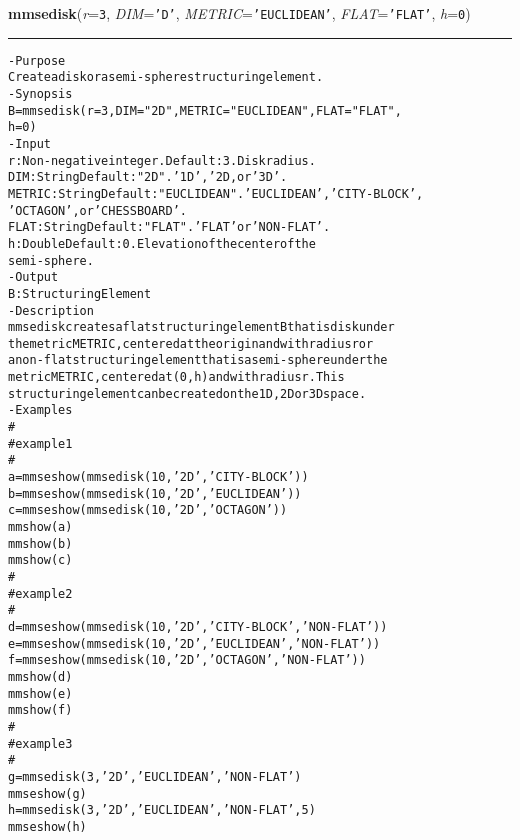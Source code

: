     \begin{boxedminipage}{\textwidth}

    \raggedright \textbf{mmsedisk}(\textit{r}=\texttt{3\-}, \textit{DIM}=\texttt{'\-D\-'\-}, \textit{METRIC}=\texttt{'\-E\-U\-C\-L\-I\-D\-E\-A\-N\-'\-}, \textit{FLAT}=\texttt{'\-F\-L\-A\-T\-'\-}, \textit{h}=\texttt{0\-})

    \vspace{-1.5ex}

    \rule{\textwidth}{0.5\fboxrule}
\begin{alltt}
- Purpose
    Create a disk or a semi-sphere structuring element.
- Synopsis
    B = mmsedisk(r=3, DIM="2D", METRIC="EUCLIDEAN", FLAT="FLAT",
    h=0)
- Input
    r:      Non-negative integer. Default: 3. Disk radius.
    DIM:    String Default: "2D". '1D', '2D, or '3D'.
    METRIC: String Default: "EUCLIDEAN". 'EUCLIDEAN', ' CITY-BLOCK',
            'OCTAGON', or ' CHESSBOARD'.
    FLAT:   String Default: "FLAT". 'FLAT' or 'NON-FLAT'.
    h:      Double Default: 0. Elevation of the center of the
            semi-sphere.
- Output
    B: Structuring Element
- Description
    mmsedisk creates a flat structuring element B that is disk under
    the metric METRIC , centered at the origin and with radius r or
    a non-flat structuring element that is a semi-sphere under the
    metric METRIC, centered at (0, h) and with radius r . This
    structuring element can be created on the 1D, 2D or 3D space.
- Examples
    \#
    \#   example 1
    \#
    a=mmseshow(mmsedisk(10,'2D','CITY-BLOCK'))
    b=mmseshow(mmsedisk(10,'2D','EUCLIDEAN'))
    c=mmseshow(mmsedisk(10,'2D','OCTAGON'))
    mmshow(a)
    mmshow(b)
    mmshow(c)
    \#
    \#   example 2
    \#
    d=mmseshow(mmsedisk(10,'2D','CITY-BLOCK','NON-FLAT'))
    e=mmseshow(mmsedisk(10,'2D','EUCLIDEAN','NON-FLAT'))
    f=mmseshow(mmsedisk(10,'2D','OCTAGON','NON-FLAT'))
    mmshow(d)
    mmshow(e)
    mmshow(f)
    \#
    \#   example 3
    \#
    g=mmsedisk(3,'2D','EUCLIDEAN','NON-FLAT')
    mmseshow(g)
    h=mmsedisk(3,'2D','EUCLIDEAN','NON-FLAT',5)
    mmseshow(h)\end{alltt}

    \vspace{1ex}

    \end{boxedminipage}

    \label{multireg:num_pymorph:mmseline}
    \vspace{0.5ex}


